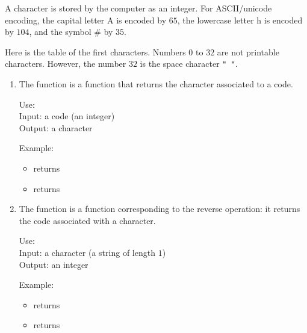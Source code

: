 \documentclass[11pt,class=report,crop=false]{standalone}
\begin{document}
\begin{cours}


A character is stored by the computer as an integer.
For ASCII/unicode encoding, the capital letter \og{}A\fg{} is encoded by $65$, the lowercase letter \og{}h\fg{} is encoded by $104$, and the symbol \og{}\#\fg{} by $35$.

Here is the table of the first characters. Numbers $0$ to $32$ are not printable characters. However, the number $32$ is the space character \lstinline[showstringspaces=true]!" "!.



\begin{enumerate}  

  \item The  function is a \Python{} function that returns the character associated to a code.
  
  \begin{fonctionpython}
  Use: \\
  Input: a code (an integer)\\
  Output: a character
  
  \medskip
     
   Example:
  \begin{itemize}  
    \item {} returns 
    \item {} returns 
  \end{itemize} 
  \end{fonctionpython} 
  
  \item The  function is a \Python{} function corresponding to the reverse operation: it returns the code associated with a character.
  
  \smallskip
  
  \begin{fonctionpython}
  Use: \\
  Input: a character (a string of length $1$)\\
  Output: an integer
  
  \medskip
     
  Example:
  \begin{itemize}  
    \item {} returns 
    \item {} returns 
  \end{itemize} 
  \end{fonctionpython}  
\end{enumerate}
\end{cours}
\end{document}
